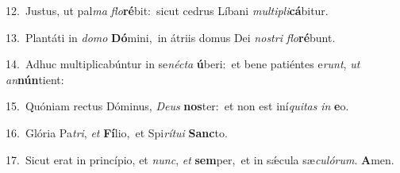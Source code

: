 {\numbfont\textcolor{\numbcolor}{12.}}~Justus, ut pal\textit{ma} \textit{flo}\-\textbf{ré}bit:~\star sicut cedrus Líbani \textit{mul}\-\textit{ti}\textit{pli}\textbf{cá}bitur.\par
{\numbfont\textcolor{\numbcolor}{13.}}~Plantáti in \textit{do}\-\textit{mo} \textbf{Dó}\-mini,~\star in átriis domus Dei \textit{nos}\-\textit{tri} \textit{flo}\-\textbf{ré}bunt.\par
{\numbfont\textcolor{\numbcolor}{14.}}~Adhuc multiplicabúntur in se\-\textit{néc}\-\textit{ta} \textbf{ú}\-beri:~\star et bene patiéntes e\-\textit{runt}\-, \textit{ut} \textit{an}\-\textbf{nún}tient:\par
{\numbfont\textcolor{\numbcolor}{15.}}~Quóniam rectus Dóminus, \textit{De}\-\textit{us} \textbf{nos}\-ter:~\star et non est iní\-\textit{qui}\-\textit{tas} \textit{in} \textbf{e}\-o.\par
{\numbfont\textcolor{\numbcolor}{16.}}~Glória Pa\-\textit{tri}\-, \textit{et} \textbf{Fí}\-lio,~\star et Spi\-\textit{rí}\-\textit{tu}\textit{i} \textbf{Sanc}\-to.\par
{\numbfont\textcolor{\numbcolor}{17.}}~Sicut erat in princípio, et \textit{nunc}\-, \textit{et} \textbf{sem}\-per,~\star et in sǽcula sæ\-\textit{cu}\-\textit{ló}\textit{rum}. \textbf{A}\-men.\par
